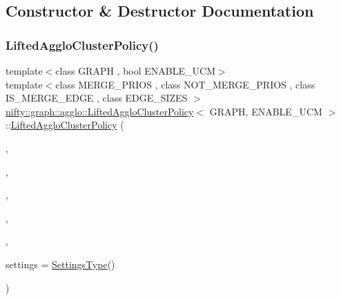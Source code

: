 \subsection{Constructor \& Destructor Documentation}
\mbox{\label{classnifty_1_1graph_1_1agglo_1_1LiftedAggloClusterPolicy_a6676fe1aac25a002816d1f951587ecd3}} 
\subsubsection{\texorpdfstring{Lifted\+Agglo\+Cluster\+Policy()}{LiftedAggloClusterPolicy()}\hspace{0.1cm}{\footnotesize\ttfamily [1/2]}}
{\footnotesize\ttfamily template$<$class G\+R\+A\+PH , bool E\+N\+A\+B\+L\+E\+\_\+\+U\+CM$>$ \\
template$<$class M\+E\+R\+G\+E\+\_\+\+P\+R\+I\+OS , class N\+O\+T\+\_\+\+M\+E\+R\+G\+E\+\_\+\+P\+R\+I\+OS , class I\+S\+\_\+\+M\+E\+R\+G\+E\+\_\+\+E\+D\+GE , class E\+D\+G\+E\+\_\+\+S\+I\+Z\+ES $>$ \\
\hyperlink{classnifty_1_1graph_1_1agglo_1_1LiftedAggloClusterPolicy}{nifty\+::graph\+::agglo\+::\+Lifted\+Agglo\+Cluster\+Policy}$<$ G\+R\+A\+PH, E\+N\+A\+B\+L\+E\+\_\+\+U\+CM $>$\+::\hyperlink{classnifty_1_1graph_1_1agglo_1_1LiftedAggloClusterPolicy}{Lifted\+Agglo\+Cluster\+Policy} (\begin{DoxyParamCaption}\item[{const \hyperlink{classnifty_1_1graph_1_1agglo_1_1LiftedAggloClusterPolicy_a727d681b2fa133b8c9b225ab11cd2402}{Graph\+Type} \&}]{,  }\item[{const M\+E\+R\+G\+E\+\_\+\+P\+R\+I\+OS \&}]{,  }\item[{const N\+O\+T\+\_\+\+M\+E\+R\+G\+E\+\_\+\+P\+R\+I\+OS \&}]{,  }\item[{const I\+S\+\_\+\+M\+E\+R\+G\+E\+\_\+\+E\+D\+GE \&}]{,  }\item[{const E\+D\+G\+E\+\_\+\+S\+I\+Z\+ES \&}]{,  }\item[{const \hyperlink{structnifty_1_1graph_1_1agglo_1_1LiftedAggloClusterPolicy_1_1SettingsType}{Settings\+Type} \&}]{settings = {\ttfamily \hyperlink{structnifty_1_1graph_1_1agglo_1_1LiftedAggloClusterPolicy_1_1SettingsType}{Settings\+Type}()} }\end{DoxyParamCaption})}

